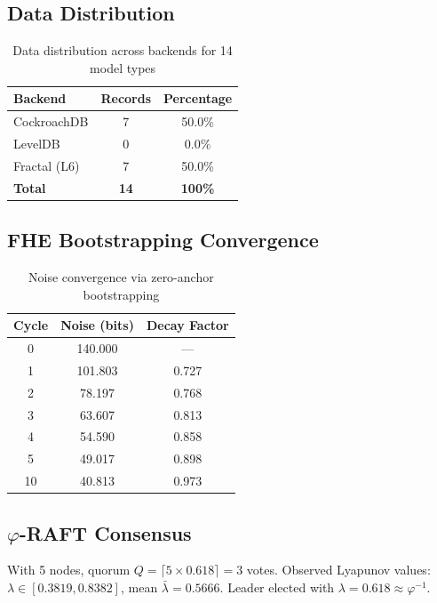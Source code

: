 \documentclass[11pt,a4paper]{article}
\begin{document}
\subsection{Data Distribution}

\begin{table}[H]
\centering
\begin{tabular}{|l|c|c|}
\hline
\textbf{Backend} & \textbf{Records} & \textbf{Percentage} \\
\hline
CockroachDB & 7 & 50.0\% \\
LevelDB & 0 & 0.0\% \\
Fractal (L6) & 7 & 50.0\% \\
\hline
\textbf{Total} & \textbf{14} & \textbf{100\%} \\
\hline
\end{tabular}
\caption{Data distribution across backends for 14 model types}
\end{table}

\subsection{FHE Bootstrapping Convergence}

\begin{table}[H]
\centering
\begin{tabular}{|c|c|c|}
\hline
\textbf{Cycle} & \textbf{Noise (bits)} & \textbf{Decay Factor} \\
\hline
0 & 140.000 & — \\
1 & 101.803 & 0.727 \\
2 & 78.197 & 0.768 \\
3 & 63.607 & 0.813 \\
4 & 54.590 & 0.858 \\
5 & 49.017 & 0.898 \\
10 & 40.813 & 0.973 \\
\hline
\end{tabular}
\caption{Noise convergence via zero-anchor bootstrapping}
\end{table}

\subsection{$\varphi$-RAFT Consensus}

With 5 nodes, quorum $Q = \lceil 5 \times 0.618 \rceil = 3$ votes. Observed Lyapunov values: $\lambda \in [0.3819, 0.8382]$, mean $\bar{\lambda} = 0.5666$. Leader elected with $\lambda = 0.618 \approx \varphi^{-1}$.
\end{document}
